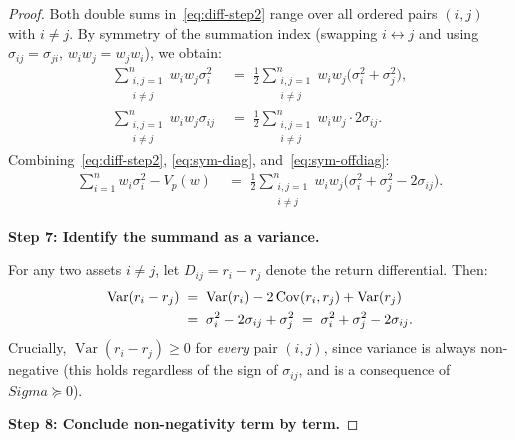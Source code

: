 \documentclass[12pt,openany]{book}
\newcommand{\bfw}{\mathbf{w}}
\newcommand{\bfSigma}{\boldsymbol{\Sigma}}
\DeclareMathOperator{\Var}{Var}
\numberwithin{equation}{chapter}
\theoremstyle{plain}
\theoremstyle{definition}
\theoremstyle{remark}
\def\bfw{w}%
\def\bfSigma{Sigma}%
\begin{document}
\begin{proof}
\medskip
\noindent Both double sums in~\eqref{eq:diff-step2} range over all
ordered pairs $(i,j)$ with $i \neq j$.  By symmetry of the summation
index (swapping $i \leftrightarrow j$ and using $\sigma_{ij} = \sigma_{ji}$,
$w_i w_j = w_j w_i$), we obtain:
\begin{align}
  \sum_{\substack{i,j=1\\i\neq j}}^n w_i w_j \sigma_i^2
  &\;=\; \frac{1}{2}
         \sum_{\substack{i,j=1\\i\neq j}}^n
         w_i w_j \bigl(\sigma_i^2 + \sigma_j^2\bigr),
  \label{eq:sym-diag}
  \\[6pt]
  \sum_{\substack{i,j=1\\i\neq j}}^n w_i w_j \sigma_{ij}
  &\;=\; \frac{1}{2}
         \sum_{\substack{i,j=1\\i\neq j}}^n
         w_i w_j \cdot 2\sigma_{ij}.
  \label{eq:sym-offdiag}
\end{align}
Combining~\eqref{eq:diff-step2}, \eqref{eq:sym-diag},
and~\eqref{eq:sym-offdiag}:
\begin{align}
  \sum_{i=1}^n w_i \sigma_i^2 - V_p(\bfw)
  &\;=\; \frac{1}{2}
         \sum_{\substack{i,j=1\\i\neq j}}^n
         w_i w_j
         \bigl(\sigma_i^2 + \sigma_j^2 - 2\sigma_{ij}\bigr).
  \label{eq:diff-sym}
\end{align}

\medskip
\noindent\textbf{Step 7: Identify the summand as a variance.}

\medskip
\noindent For any two assets $i \neq j$, let
$D_{ij} = r_i - r_j$ denote the return differential.  Then:
\begin{align}
  \Var(r_i - r_j)
  &\;=\; \Var(r_i) - 2\,\mathrm{Cov}(r_i,r_j) + \Var(r_j)
  \notag\\
  &\;=\; \sigma_i^2 - 2\sigma_{ij} + \sigma_j^2
  \;=\; \sigma_i^2 + \sigma_j^2 - 2\sigma_{ij}.
  \label{eq:var-diff}
\end{align}
Crucially, $\Var(r_i - r_j) \geq 0$ for \emph{every} pair
$(i,j)$, since variance is always non-negative
(this holds regardless of the sign of $\sigma_{ij}$,
and is a consequence of $\bfSigma \succeq 0$).

\medskip
\noindent\textbf{Step 8: Conclude non-negativity term by term.}


\end{proof}
\end{document}
